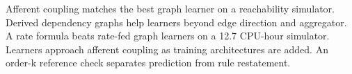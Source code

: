 Afferent coupling matches the best graph learner on a reachability simulator.
Derived dependency graphs help learners beyond edge direction and aggregator.
A rate formula beats rate-fed graph learners on a 12.7 CPU-hour simulator.
Learners approach afferent coupling as training architectures are added.
An order-k reference check separates prediction from rule restatement.
